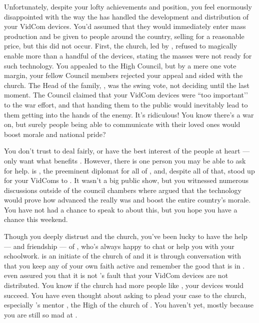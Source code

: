 \documentclass[char]{GL2020}
\begin{document}
Unfortunately, despite your lofty achievements and position, you feel enormously disappointed with the way the \pTech{} has handled the development and distribution of your VidCom devices. You'd assumed that they would immediately enter mass production and be given to people around the country, selling for a reasonable price, but this did not occur. First, the church, led by \cAntiChup{\intro}, refused to magically enable more than a handful of the devices, stating the masses were not ready for such technology. You appealed to the High Council, but by a mere one vote margin, your fellow Council members rejected your appeal and sided with the church. The Head of the \cHeir{\formal} family, \cFaledonParent{\intro}, was the swing vote, not deciding until the last moment. The Council claimed that your VidCom devices were ``too important'’ to the war effort, and that handing them to the public would inevitably lead to them getting into the hands of the enemy. It's ridiculous!  You know there's a war on, but surely people being able to communicate with their loved ones would boost morale and national pride? 

You don't trust \cFaledonParent{} to deal fairly, or have the best interest of the people at heart — \cFaledonParent{\they} only want\cFaledonParent{\verbs} what benefits \cFaledonParent{\them}. However, there is one person you may be able to ask for help. \cDiplomat{\intro} is \cFaledonParent{\sibling}, the preeminent diplomat for all of \pTech{}, and, despite all of that, stood up for your VidComs to \cFaledonParent{\them}. It wasn’t a big public show, but you witnessed numerous discussions outside of the council chambers where \cDiplomat{} argued that the technology would prove how advanced the \pTech{} really was and boost the entire country’s morale. You have not had a chance to speak to \cDiplomat{} about this, but you hope you have a chance this weekend. 

Though you deeply distrust \cAntiChup{} and the church, you've been lucky to have the help — and friendship — of \cScholarship{\intro}, who's always happy to chat or help you with your schoolwork. \cScholarship{} is an initiate of the church of \cTechGod{} and it is through conversation with \cScholarship{\them} that you keep any of your own faith active and remember the good that is in \cTechGod{}. \cScholarship{\Theyhave} even assured you that it is not \cTechGod{}’s fault that your VidCom devices are not distributed. You know if the church had more people like \cScholarship{}, your devices would succeed. You have even thought about asking \cScholarship{\them} to plead your case to the church, especially \cScholarship{}’s mentor \cAntiChup{}, the High \cAntiChup{\Cleric} of the church of \cTechGod{}. You haven’t yet, mostly because you are still so mad at \cAntiChup{}.
\end{document}
